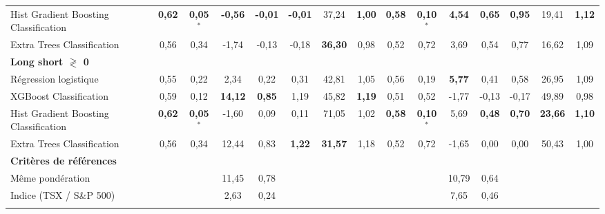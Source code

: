 \begin{table}[h]
{\begin{tabular}{l *{7}{S[table-format=3.2]} | *{7}{S[table-format=3.2]}}
Hist Gradient Boosting Classification & \bfseries\color{Green}0,62 & \bfseries\color{Green}0,05$^{*}$ & \bfseries\color{Green}-0,56 & \bfseries\color{Green}-0,01 & \bfseries\color{Green}-0,01 & 37,24 & \bfseries\color{Green}1,00 & \bfseries\color{Green}0,58 & \bfseries\color{Green}0,10$^{*}$ & \bfseries\color{Green}4,54 & \bfseries\color{Green}0,65 & \bfseries\color{Green}0,95 & 19,41 & \bfseries\color{Green}1,12 \\ \addlinespace[0.1cm]
Extra Trees Classification & 0,56 & 0,34 & -1,74 & -0,13 & -0,18 & \bfseries\color{Green}36,30 & 0,98 & 0,52 & 0,72 & 3,69 & 0,54 & 0,77 & 16,62 & 1,09 \\ \addlinespace[0.1cm]
\textbf{Long short $\gtrless$ 0} &  &  &  &  &  &  &  &  &  &  &  &  &  & \\
\addlinespace[0.1cm]
Régression logistique & 0,55 & 0,22 & 2,34 & 0,22 & 0,31 & 42,81 & 1,05 & 0,56 & 0,19 & \bfseries\color{Green}5,77 & 0,41 & 0,58 & 26,95 & 1,09 \\ \addlinespace[0.1cm]
XGBoost Classification & 0,59 & 0,12 & \bfseries\color{Green}14,12 & \bfseries\color{Green}0,85 & 1,19 & 45,82 & \bfseries\color{Green}1,19 & 0,51 & 0,52 & -1,77 & -0,13 & -0,17 & 49,89 & 0,98 \\ \addlinespace[0.1cm]
Hist Gradient Boosting Classification & \bfseries\color{Green}0,62 & \bfseries\color{Green}0,05$^{*}$ & -1,60 & 0,09 & 0,11 & 71,05 & 1,02 & \bfseries\color{Green}0,58 & \bfseries\color{Green}0,10$^{*}$ & 5,69 & \bfseries\color{Green}0,48 & \bfseries\color{Green}0,70 & \bfseries\color{Green}23,66 & \bfseries\color{Green}1,10 \\ \addlinespace[0.1cm]
Extra Trees Classification & 0,56 & 0,34 & 12,44 & 0,83 & \bfseries\color{Green}1,22 & \bfseries\color{Green}31,57 & 1,18 & 0,52 & 0,72 & -1,65 & 0,00 & 0,00 & 50,43 & 1,00 \\ \addlinespace[0.1cm]
\textbf{Critères de références} &  &  &  &  &  &  &  &  &  &  &  &  &  & \\
\addlinespace[0.1cm]
Même pondération &  &  & 11,45 & 0,78 &  &  &  &  &  & 10,79 & 0,64 &  &  &  \\ \addlinespace[0.1cm]
Indice (TSX / S\&P 500) &  &  & 2,63 & 0,24 &  &  &  &  &  & 7,65 & 0,46 &  &  &  \\ \addlinespace[0.1cm]
\bottomrule
\end{tabular}}
\end{table}
